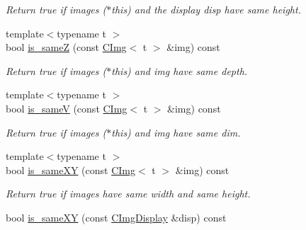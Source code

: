 \begin{DoxyCompactItemize}
\begin{DoxyCompactList}\small\item\em Return {\ttfamily true} if images {\ttfamily }($\ast$this) and the display {\ttfamily disp} have same height. \item\end{DoxyCompactList}\item 
\hypertarget{structcimg__library_1_1_c_img_a0cb6b2d2e03ad9575d1c0ab35d6eb5e4}{
{\footnotesize template$<$typename t $>$ }\\bool \hyperlink{structcimg__library_1_1_c_img_a0cb6b2d2e03ad9575d1c0ab35d6eb5e4}{is\_\-sameZ} (const \hyperlink{structcimg__library_1_1_c_img}{CImg}$<$ t $>$ \&img) const }
\label{structcimg__library_1_1_c_img_a0cb6b2d2e03ad9575d1c0ab35d6eb5e4}

\begin{DoxyCompactList}\small\item\em Return {\ttfamily true} if images {\ttfamily }($\ast$this) and {\ttfamily img} have same depth. \item\end{DoxyCompactList}\item 
\hypertarget{structcimg__library_1_1_c_img_a16eaf2715549be53fb62e58d57dbe347}{
{\footnotesize template$<$typename t $>$ }\\bool \hyperlink{structcimg__library_1_1_c_img_a16eaf2715549be53fb62e58d57dbe347}{is\_\-sameV} (const \hyperlink{structcimg__library_1_1_c_img}{CImg}$<$ t $>$ \&img) const }
\label{structcimg__library_1_1_c_img_a16eaf2715549be53fb62e58d57dbe347}

\begin{DoxyCompactList}\small\item\em Return {\ttfamily true} if images {\ttfamily }($\ast$this) and {\ttfamily img} have same dim. \item\end{DoxyCompactList}\item 
\hypertarget{structcimg__library_1_1_c_img_af4731def95a5ee421a35451e63884dcd}{
{\footnotesize template$<$typename t $>$ }\\bool \hyperlink{structcimg__library_1_1_c_img_af4731def95a5ee421a35451e63884dcd}{is\_\-sameXY} (const \hyperlink{structcimg__library_1_1_c_img}{CImg}$<$ t $>$ \&img) const }
\label{structcimg__library_1_1_c_img_af4731def95a5ee421a35451e63884dcd}

\begin{DoxyCompactList}\small\item\em Return {\ttfamily true} if images have same width and same height. \item\end{DoxyCompactList}\item 
\hypertarget{structcimg__library_1_1_c_img_aea56577e695bd44512d4acecac27a3a5}{
bool \hyperlink{structcimg__library_1_1_c_img_aea56577e695bd44512d4acecac27a3a5}{is\_\-sameXY} (const \hyperlink{structcimg__library_1_1_c_img_display}{CImgDisplay} \&disp) const }
\label{structcimg__library_1_1_c_img_aea56577e695bd44512d4acecac27a3a5}


\end{DoxyCompactItemize}
